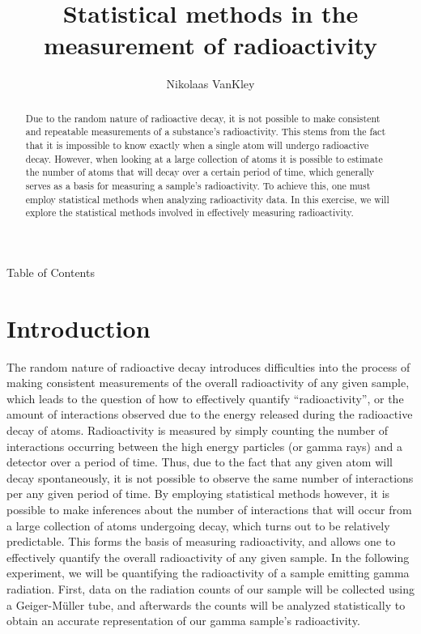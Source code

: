 \documentclass[12pt]{article}   	%
\title{Statistical methods in the measurement of radioactivity}
\author{Nikolaas VanKley}
\date{}							%
\begin{document}
\maketitle
\vspace*{1in}
\begin{abstract}
 Due to the random nature of radioactive decay, it is not possible to make consistent and repeatable measurements of a 
 substance's radioactivity. This stems from the fact that it is impossible to know exactly when a single atom will undergo 
 radioactive decay. However, when looking at a large collection of atoms it is possible to estimate the number of atoms that will
 decay over a certain period of time, which generally serves as a basis for measuring a sample's radioactivity. To achieve this, one must employ statistical methods when analyzing radioactivity data. In this exercise, we will explore the statistical
 methods involved in effectively measuring radioactivity.
\end{abstract}
\pagebreak
Table of Contents
\pagebreak
\twocolumn
\section{Introduction}
 The random nature of radioactive decay introduces difficulties into the process of making consistent measurements of the overall
 radioactivity of any given sample, which leads to the question of how to effectively quantify “radioactivity”, or the amount of
 interactions observed due to the energy released during the radioactive decay of atoms. Radioactivity is measured by simply
 counting the number of interactions occurring between the high energy particles (or gamma rays) and a detector over a period of 
 time. Thus, due to the fact that any given atom will decay spontaneously, it is not possible to observe the same number of
 interactions per any given period of time. By employing statistical methods however, it is possible to make inferences about the
 number of interactions that will occur from a large collection of atoms undergoing decay, which turns out to be relatively
 predictable. This forms the basis of measuring radioactivity, and allows one to effectively quantify the overall radioactivity
 of any given sample. In the following experiment, we will be quantifying the radioactivity of a sample emitting gamma radiation.
 First, data on the radiation counts of our sample will be collected using a Geiger-Müller tube, and afterwards the counts will
 be analyzed statistically to obtain an accurate representation of our gamma sample's radioactivity. 
\end{document}
